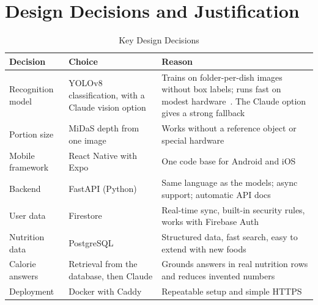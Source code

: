 \section{Design Decisions and Justification}
\begin{table}[H]
\centering
\caption{Key Design Decisions}
\label{tab:decisions}
\small
\begin{tabularx}{\textwidth}{|>{\raggedright\arraybackslash}p{3.2cm}|>{\raggedright\arraybackslash}p{3.6cm}|>{\raggedright\arraybackslash}X|}
\hline
\textbf{Decision} & \textbf{Choice} & \textbf{Reason} \\ \hline
Recognition model & YOLOv8 classification, with a Claude vision option & Trains on folder-per-dish images without box labels; runs fast on modest hardware~\cite{yolo_ult}. The Claude option gives a strong fallback \\ \hline
Portion size & MiDaS depth from one image & Works without a reference object or special hardware~\cite{midas} \\ \hline
Mobile framework & React Native with Expo & One code base for Android and iOS~\cite{expo} \\ \hline
Backend & FastAPI (Python) & Same language as the models; async support; automatic API docs~\cite{fastapi} \\ \hline
User data & Firestore & Real-time sync, built-in security rules, works with Firebase Auth~\cite{firebase} \\ \hline
Nutrition data & PostgreSQL & Structured data, fast search, easy to extend with new foods \\ \hline
Calorie answers & Retrieval from the database, then Claude & Grounds answers in real nutrition rows and reduces invented numbers~\cite{rag,anthropic} \\ \hline
Deployment & Docker with Caddy & Repeatable setup and simple HTTPS~\cite{docker,caddy} \\ \hline
\end{tabularx}
\end{table}
